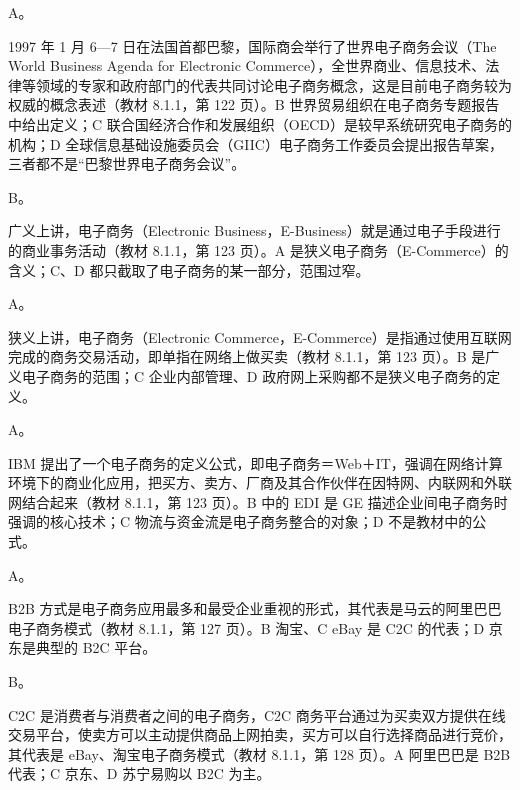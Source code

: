 \documentclass[a4paper,11pt]{article}
\begin{document}


\q A。\begin{analysis}1997 年 1 月 6—7 日在法国首都巴黎，国际商会举行了世界电子商务会议（The World Business Agenda for Electronic Commerce），全世界商业、信息技术、法律等领域的专家和政府部门的代表共同讨论电子商务概念，这是目前电子商务较为权威的概念表述（教材 8.1.1，第 122 页）。B 世界贸易组织在电子商务专题报告中给出定义；C 联合国经济合作和发展组织（OECD）是较早系统研究电子商务的机构；D 全球信息基础设施委员会（GIIC）电子商务工作委员会提出报告草案，三者都不是“巴黎世界电子商务会议”。\end{analysis}

\q B。\begin{analysis}广义上讲，电子商务（Electronic Business，E-Business）就是通过电子手段进行的商业事务活动（教材 8.1.1，第 123 页）。A 是狭义电子商务（E-Commerce）的含义；C、D 都只截取了电子商务的某一部分，范围过窄。\end{analysis}

\q A。\begin{analysis}狭义上讲，电子商务（Electronic Commerce，E-Commerce）是指通过使用互联网完成的商务交易活动，即单指在网络上做买卖（教材 8.1.1，第 123 页）。B 是广义电子商务的范围；C 企业内部管理、D 政府网上采购都不是狭义电子商务的定义。\end{analysis}

\q A。\begin{analysis}IBM 提出了一个电子商务的定义公式，即电子商务＝Web＋IT，强调在网络计算环境下的商业化应用，把买方、卖方、厂商及其合作伙伴在因特网、内联网和外联网结合起来（教材 8.1.1，第 123 页）。B 中的 EDI 是 GE 描述企业间电子商务时强调的核心技术；C 物流与资金流是电子商务整合的对象；D 不是教材中的公式。\end{analysis}

\q A。\begin{analysis}B2B 方式是电子商务应用最多和最受企业重视的形式，其代表是马云的阿里巴巴电子商务模式（教材 8.1.1，第 127 页）。B 淘宝、C eBay 是 C2C 的代表；D 京东是典型的 B2C 平台。\end{analysis}

\q B。\begin{analysis}C2C 是消费者与消费者之间的电子商务，C2C 商务平台通过为买卖双方提供在线交易平台，使卖方可以主动提供商品上网拍卖，买方可以自行选择商品进行竞价，其代表是 eBay、淘宝电子商务模式（教材 8.1.1，第 128 页）。A 阿里巴巴是 B2B 代表；C 京东、D 苏宁易购以 B2C 为主。\end{analysis}
\end{document}
